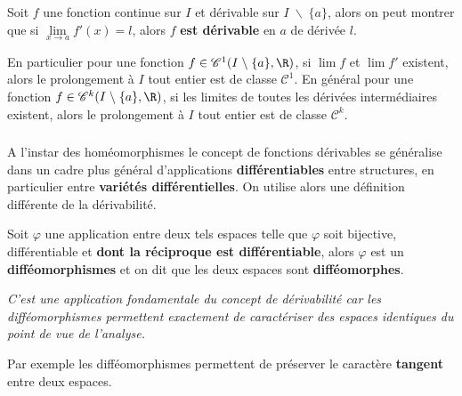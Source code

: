 \subsection*{}

Soit \(f\) une fonction continue sur \(I\) et dérivable sur \(I \; \backslash \; \{a\}\), alors on peut montrer que si \(\underset{x \rightarrow a}{\lim} f'(x) =  l\), alors \(f\) \textbf{est dérivable} en \(a\) de dérivée \(l\).\<

En particulier pour une fonction \(f \in \mathscr{C}^1(I \; \backslash \; \{a\}, \R)\), si \({\lim}f\) et \({\lim}f'\) existent, alors le prolongement à \(I\) tout entier est de classe \(\mathscr{C}^1\).\+
En général pour une fonction \(f \in \mathscr{C}^k(I \; \backslash \; \{a\}, \R)\), si les limites de toutes les dérivées intermédiaires existent, alors le prolongement à \(I\) tout entier est de classe \(\mathscr{C}^k\).

\subsection*{}

A l'instar des homéomorphismes le concept de fonctions dérivables se généralise dans un cadre plus général d'applications \textbf{différentiables} entre structures, en particulier entre \textbf{variétés différentielles}. On utilise alors une définition différente de la dérivabilité.\<

Soit \(\varphi\) une application entre deux tels espaces telle que \(\varphi\) soit bijective, différentiable et \textbf{dont la réciproque est différentiable}, alors \(\varphi\) est un \textbf{difféomorphismes} et on dit que les deux espaces sont \textbf{difféomorphes}.
\begin{center}
   \textit{
      C'est une application fondamentale du concept de dérivabilité car les difféomorphismes permettent exactement de caractériser des espaces identiques du point de vue de l'analyse.
   }
\end{center}
Par exemple les difféomorphismes permettent de préserver le caractère \textbf{tangent} entre deux espaces.

\chapter*{} %

